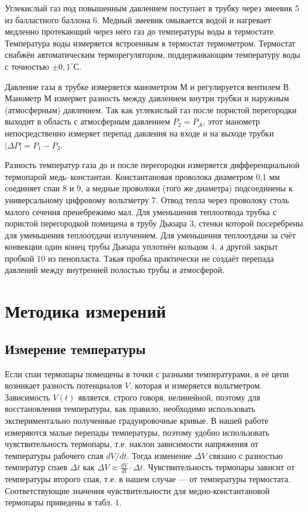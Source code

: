 \documentclass{article}
\begin{document}
Углекислый газ под повышенным давлением поступает в трубку через змеевик 5 из балластного баллона 6. Медный змеевик омывается водой и нагревает медленно протекающий через него газ до температуры воды в термостате. Температура воды измеряется встроенным в термостат термометром. Термостат снабжён автоматическим терморегулятором, поддерживающим температуру воды с точностью $\pm 0,1^\circ$С.

Давление газа в трубке измеряется манометром М и регулируется вентилем В. Манометр М измеряет разность между давлением внутри трубки и наружным (атмосферным) давлением. Так как углекислый газ после пористой перегородки выходит в область с атмосферным давлением $P_2 = P_A$, этот манометр непосредственно измеряет перепад давления на входе и на выходе трубки $|\Delta P| = P_1 - P_2$.

Разность температур газа до и после перегородки измеряется дифференциальной термопарой медь–константан. Константановая проволока диаметром 0,1 мм соединяет спаи 8 и 9, а медные проволоки (того же диаметра) подсоединены к универсальному цифровому вольтметру 7. Отвод тепла через проволоку столь малого сечения пренебрежимо мал. Для уменьшения теплоотвода трубка с пористой перегородкой помещена в трубу Дьюара 3, стенки которой посеребрены для уменьшения теплоотдачи излучением. Для уменьшения теплоотдачи за счёт конвекции один конец трубы Дьюара уплотнён кольцом 4, а другой закрыт пробкой 10 из пенопласта. Такая пробка практически не создаёт перепада давлений между внутренней полостью трубы и атмосферой.

\section* {Методика измерений}
\subsection*{Измерение температуры}

Если спаи термопары помещены в точки с разными температурами, в её цепи возникает разность потенциалов $V$, которая и измеряется вольтметром. Зависимость $V(t)$ является, строго говоря, нелинейной, поэтому для восстановления температуры, как правило, необходимо использовать экспериментально полученные градуировочные кривые. В нашей работе измеряются малые перепады температуры, поэтому удобно использовать чувствительность термопары, т.е. наклон зависимости напряжения от температуры рабочего спая $dV/dt$. Тогда изменение $\Delta V$ связано с разностью температур спаев $\Delta t$ как $\Delta V \approx \frac{dV}{dt} \cdot \Delta t$. Чувствительность термопары зависит от температуры второго спая, т.е. в нашем случае — от температуры термостата. Соответствующие значения чувствительности для медно-константановой термопары приведены в табл. 1. 
\end{document}
